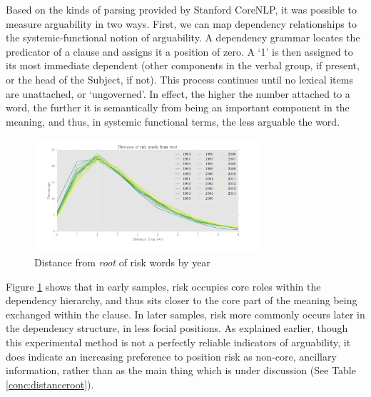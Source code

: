     Based on the kinds of parsing provided by Stanford CoreNLP, it was possible to measure arguability in two ways. First, we can map dependency relationships to the systemic-functional notion of arguability. A dependency grammar locates the predicator of a clause and assigns it a position of zero. A `1' is then assigned to its most immediate dependent (other components in the verbal group, if present, or the head of the Subject, if not). This process continues until no lexical items are unattached, or `ungoverned'. In effect, the higher the number attached to a word, the further it is semantically from being an important component in the meaning, and thus, in systemic functional terms, the less arguable the word.
    \begin{figure}[htb!]
    \centering
    \includegraphics[width=0.75\textwidth]{../images/distance-of-risk-words-from-root}
    \caption{Distance from \emph{root} of risk words by year}
    \label{fig:depnum}
    \end{figure}
    Figure \ref{fig:depnum} shows that in early samples, risk occupies core roles within the dependency hierarchy, and thus sits closer to the core part of the meaning being exchanged within the clause. In later samples, risk more commonly occurs later in the dependency structure, in less focial positions. As explained earlier, though this experimental method is not a perfectly reliable indicators of arguability, it does indicate an increasing preference to position risk as non-core, ancillary information, rather than as the main thing which is under discussion (See Table \ref{conc:distanceroot}).
